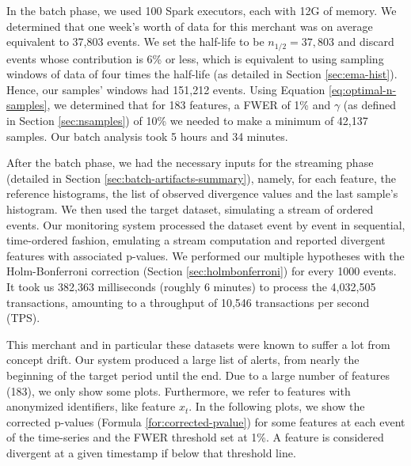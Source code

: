 In the batch phase, we used 100 Spark executors, each with 12G of memory. We determined that one week's worth of data for this merchant was on average equivalent to 37,803 events. We set the half-life to be $n_{1/2}=37,803$ and discard events whose contribution is 6\% or less, which is equivalent to using sampling windows of data of four times the half-life (as detailed in Section \ref{sec:ema-hist}). Hence, our samples' windows had 151,212 events. Using Equation \ref{eq:optimal-n-samples}, we determined that for 183 features, a FWER of 1\% and $\gamma$ (as defined in Section \ref{sec:nsamples}) of 10\% we needed to make a minimum of 42,137 samples. Our batch analysis took 5 hours and 34 minutes.

After the batch phase, we had the necessary inputs for the streaming phase (detailed in Section \ref{sec:batch-artifacts-summary}), namely, for each feature, the reference histograms, the list of observed divergence values and the last sample's histogram. We then used the target dataset, simulating a stream of ordered events. Our monitoring system processed the dataset event by event in sequential, time-ordered fashion, emulating a stream computation and reported divergent features with associated p-values. We performed our multiple hypotheses with the Holm-Bonferroni correction (Section \ref{sec:holmbonferroni}) for every 1000 events. It took us 382,363 milliseconds (roughly 6 minutes) to process the 4,032,505 transactions, amounting to a throughput of 10,546 transactions per second (TPS).

This merchant and in particular these datasets were known to suffer a lot from concept drift. Our system produced a large list of alerts, from nearly the beginning of the target period until the end. Due to a large number of features (183), we only show some plots. Furthermore, we refer to features with anonymized identifiers, like feature $x_t$. In the following plots, we show the corrected p-values (Formula \ref{for:corrected-pvalue}) for some features at each event of the time-series and the FWER threshold set at 1\%. A feature is considered divergent at a given timestamp if below that threshold line.

